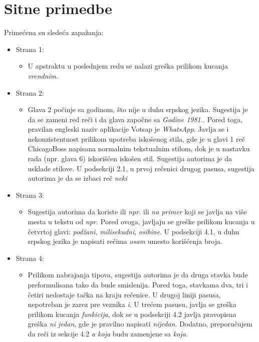 \documentclass[a4paper]{report}
\begin{document}
\section{Sitne primedbe}
Primećena su sledeća zapažanja:
\begin{itemize}
    \item Strana 1:
    \begin{itemize}
        \item U apstraktu u poslednjem redu se nalazi greška prilikom kucanja \textit{vrendnim}.
    \end{itemize}
    \item Strana 2:
    \begin{itemize}
        \item Glava 2 počinje sa godinom, što nije u duhu srpskog jezika. Sugestija je da se zameni red reči i da glava započne sa \textit{Godine 1981.}. Pored toga, pravilan engleski naziv aplikacije Votsap je \textit{WhatsApp}. Javlja se i nekonzistentnost prilikom upotreba iskošenog stila, gde je u glavi 1 reč ChicagoBoss napisana normalnim tekstualnim stilom, dok je u nastavku rada (npr. glava 6) iskorišćen iskošen stil. Sugestija autorima je da usklade stilove.
        U podsekciji 2.1, u prvoj rečenici drugog pasusa, sugestija autorima je da se izbaci reč \textit{neki}
    \end{itemize}
    \item Strana 3:
    \begin{itemize}
        \item Sugestija autorima da koriste ili \textit{npr.} ili \textit{na primer} koji se javlja na više mesta u tekstu od \textit{npr.} Pored ovoga, javljaju se greške prilikom kucanja u četvrtoj glavi: \textit{podžani}, \textit{milisekudni}, \textit{osibine}. U podsekciji 4.1, u duhu srpskog jezika je napisati rečima \textit{osam} umesto korišćenja broja.
    \end{itemize}
    \item Strana 4:
    \begin{itemize}
        \item Prilikom nabrajanja tipova, sugestija autorima je da druga stavka bude preformulisana tako da bude smislenija. Pored toga, stavkama dva, tri i četiri nedostaje tačka na kraju rečenice. U drugoj liniji pasusa, nepotreban je zarez pre veznika \textit{i}. U trećem pasusu, javlja se greška prilikom kucanja \textit{funkicija}, dok se u podsekciji 4.2 javlja pravopisna greška \textit{ni jedan}, gde je pravilno napisati \textit{nijedan}. Dodatno, preporučujem da reči iz sekcije 4.2 \textit{a koja} budu zamenjene sa \textit{koja}.

\end{itemize}
\end{itemize}
\end{document}
